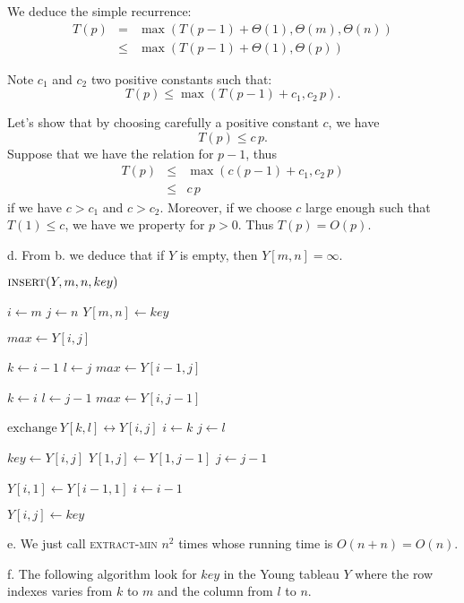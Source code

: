 \documentclass[a4paper,12pt]{article}
\newcommand{\subpar}[1]{\medskip \noindent #1.}
\newcommand{\la}{\leftarrow}
\newcommand{\exchange}[2]{\mathrm{exchange}\ #1 \leftrightarrow #2}
\newenvironment{alg}[2]
               {\noindent $\textsc{#1}(#2)$ \begin{algorithmic}}
               {\end{algorithmic}}
\begin{document}
We deduce the simple recurrence:
\begin{eqnarray*}
  T(p) &=& \max\left(T(p-1) + \Theta(1), \Theta(m), \Theta(n)\right) \\
  &\le& \max\left(T(p-1) + \Theta(1), \Theta(p)\right)
\end{eqnarray*}

Note $c_1$ and $c_2$ two positive constants such that:
\[ T(p) \le \max(T(p-1) + c_1, c_2\,p).\]

Let's show that by choosing carefully a positive constant $c$, we have
\[ T(p) \le c\,p.\]
Suppose that we have the relation for $p-1$, thus
\begin{eqnarray*}
  T(p) &\le& \max(c(p-1) + c_1, c_2\,p) \\
  &\le& c\,p
\end{eqnarray*}
if we have $c > c_1$ and $c > c_2$.  Moreover, if we choose $c$ large
enough such that $T(1) \le c$, we have we property for $p > 0$.  Thus
$T(p) = O(p)$.

\subpar{d}
From b. we deduce that if $Y$ is empty, then $Y[m, n] = \infty$.

\begin{alg}{insert}{Y, m, n, key}
  \STATE $i \la m$
  \STATE $j \la n$
  \STATE $Y[m, n] \la key$

  \STATE $max \la Y[i, j]$

  \STATE $k \la i-1$
  \STATE $l \la j$
  \STATE $max \la Y[i-1, j]$
  \ENDIF

  \STATE $k \la i$
  \STATE $l \la j-1$
  \STATE $max \la Y[i, j-1]$
  \ENDIF

  \RETURN
  \ENDIF

  \STATE $\exchange{Y[k, l]}{Y[i, j]}$
  \STATE $i \la k$
  \STATE $j \la l$
  \ENDWHILE

  \STATE $key \la Y[i, j]$
  \STATE $Y[1, j] \la Y[1, j-1]$
  \STATE $j \la j-1$
  \ENDWHILE

  \ELSE
  \STATE $Y[i, 1] \la Y[i-1, 1]$
  \STATE $i \la i-1$
  \ENDWHILE
  \ENDIF

  \STATE $Y[i, j] \la key$
\end{alg}

\subpar{e}  We just call \textsc{extract-min} $n^2$ times whose
running time is $O(n+n) = O(n)$.

\subpar{f} The following algorithm look for $key$ in the Young tableau
$Y$ where the row indexes varies from $k$ to $m$ and the column from
$l$ to $n$.
\end{document}
